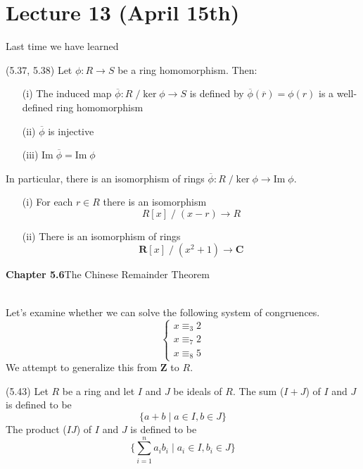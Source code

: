 \section{Lecture 13 (April 15th)}
Last time we have learned
\begin{thm}
(5.37, 5.38) Let $\phi :R\rightarrow S$ be a ring homomorphism. Then: 
\begin{itemize}
\item[(i)] The induced map $\overline{\phi }:R\;/\;\mathrm{ker}\;\phi \rightarrow S$ is defined by $\overline{\phi }(\overline{r})=\phi (r)$ is a well-defined ring homomorphism
\item[(ii)] $\overline{\phi }$ is injective
\item[(iii)] $\mathrm{Im}\;\overline{\phi }=\mathrm{Im}\;\phi $
\end{itemize}
In particular, there is an isomorphism of rings $\overline{\phi }:R\;/\;\mathrm{ker}\;\phi \rightarrow \mathrm{Im}\;\phi $. 
\end{thm}
\vspace{2ex}
\begin{ex}
\begin{itemize}
\item[(i)] For each $r\in R$ there is an isomorphism
\[R[x]\;/\;(x-r)\rightarrow R\]
\item[(ii)] There is an isomorphism of rings
\[{\bm R}[x]\;/\;(x^2+1)\rightarrow {\bm C}\]
\end{itemize}
\end{ex}
\vspace{2ex}
{\bf Chapter 5.6}\hspace{2ex}The Chinese Remainder Theorem
\\\\
\begin{ex}
Let's examine whether we can solve the following system of congruences.
\[\begin{cases}
x\equiv_3 2\\
x\equiv_7 2\\
x\equiv_8 5
\end{cases}\]
We attempt to generalize this from ${\bm Z}$ to $R$.
\end{ex}
\vspace{2ex}
\begin{defi}
(5.43) Let $R$ be a ring and let $I$ and $J$ be ideals of $R$. The sum ($I+J$) of $I$ and $J$ is defined to be 
\[\{a+b \;|\; a\in I,b\in J\}\]
The product ($IJ$) of $I$ and $J$ is defined to be
\[\Big\{\sum _{i=1}^{n}a_ib_{i} \;|\;a_{i}\in I,b_{i}\in J \Big\}\]
\end{defi}
